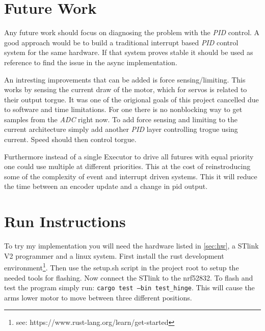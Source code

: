 \documentclass[lang=en, hanging-titles=true]{skrapport}
\begin{document}
\section{Future Work}
Any future work should focus on diagnosing the problem with the \textit{PID} control. A good approach would be to build a traditional interrupt based \textit{PID} control system for the same hardware. If that system proves stable it should be used as reference to find the issue in the async implementation. 

An intresting improvements that can be added is force sensing/limiting. This works by sensing the current draw of the motor, which for servos is related to their output torgue. It was one of the origional goals of this project cancelled due to software and time limitations. For one there is no nonblocking way to get samples from the \textit{ADC} right now. To add force sensing and limiting to the current architecture simply add another \textit{PID} layer controlling trogue using current. Speed should then control torgue.

Furthermore instead of a single Executor to drive all futures with equal priority one could use multiple at different priorities. This at the cost of reinstroducing some of the complexity of event and interrupt driven systems. This it will reduce the time between an encoder update and a change in pid output.

\clearpage
\appendix
\section{Run Instructions}
To try my implementation you will need the hardware listed in \cref{sec:hw}, a STlink V2 programmer and a linux system. First install the rust development environment\footnote{see: https://www.rust-lang.org/learn/get-started}. Then use the setup.sh script in the project root to setup the needed tools for flashing. Now connect the STlink to the nrf52832. To flash and test the program simply run: \texttt{cargo test ---bin test\_hinge}. This will cause the arms lower motor to move between three different positions.

\printbibliography
\end{document}
